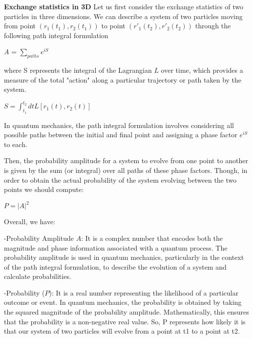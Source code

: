 \documentclass[12pt]{report}
\begin{document}
	
	\begin{minipage}{1 \textwidth}
		\textbf{Exchange statistics in 3D }\newline
		Let us first consider the exchange statistics of two particles in three dimensions.  We can describe a system of two particles moving from point $(r_1(t_1),r_2(t_1))$ to point $(r'_1(t_2),r'_2(t_2))$ through the following path integral formulation 
		
		\begin{center}
			$A$ = $\sum_{paths} e^{iS}$
		\end{center}
		
		where S represents the integral of the Lagrangian $L$ over time, which provides a measure of the total "action" along a particular trajectory or path taken by the system. 
		
		\begin{center}
			$S = \int_{t_1}^{t_2}dt \textit{L} [ r_1(t),r_2(t) ] $
		\end{center}
		
		In quantum mechanics, the path integral formulation involves considering all possible paths between the initial and final point and assigning a phase factor $e^{iS}$ to each.\newline
		
		Then, the probability amplitude for a system to evolve from one point to another is given by the sum (or integral) over all paths of these phase factors. Though, in order to obtain the actual probability of the system evolving between the two points we should compute:
		
		\begin{center}
			$P= |A|^2 $
		\end{center}
		
		Overall, we have:\newline
		
		-Probability Amplitude $A$: It is a complex number that encodes both the magnitude and phase information associated with a quantum process. The probability amplitude is used in quantum mechanics, particularly in the context of the path integral formulation, to describe the evolution of a system and calculate probabilities.\newline
		
		-Probability ($P$): It is a real number representing the likelihood of a particular outcome or event. In quantum mechanics, the probability is obtained by taking the squared magnitude of the probability amplitude. Mathematically, this ensures that the probability is a non-negative real value. So, P represents how likely it is that our system of two particles will evolve from a point at t1 to a point at t2.\newline
		

\end{minipage}
\end{document}
